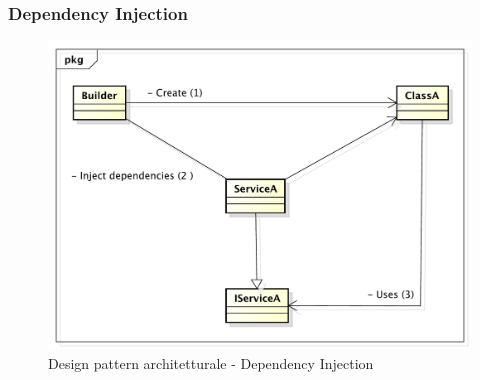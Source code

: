 		\newpage
		\subsubsection{Dependency Injection} %

		\begin{figure}[htbp]
			\centering
			\centerline{\includegraphics[scale=0.5]{./images/designpatternappendice/dep_injection.pdf}}
			\caption{Design pattern architetturale - Dependency Injection}
		\end{figure}

